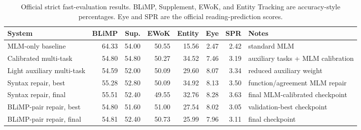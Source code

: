 \begin{table}[t]
\centering
\small
\begin{tabular}{lrrrrrrl}
\toprule
\textbf{System} & \textbf{BLiMP} & \textbf{Sup.} & \textbf{EWoK} & \textbf{Entity} & \textbf{Eye} & \textbf{SPR} & \textbf{Notes} \\
\midrule
MLM-only baseline & 64.33 & 54.00 & 50.55 & 15.56 & 2.47 & 2.42 & standard MLM \\
Calibrated multi-task & 54.80 & 54.80 & 50.27 & 34.52 & 7.46 & 3.19 & auxiliary tasks + MLM calibration \\
Light auxiliary multi-task & 54.59 & 52.00 & 50.09 & 29.60 & 8.07 & 3.34 & reduced auxiliary weight \\
Syntax repair, best & 55.28 & 52.80 & 50.09 & 34.92 & 8.13 & 3.50 & function/agreement MLM repair \\
Syntax repair, final & 55.51 & 52.40 & 49.55 & 32.76 & 8.28 & 3.63 & final MLM-calibrated checkpoint \\
BLiMP-pair repair, best & 54.80 & 51.60 & 51.00 & 27.54 & 8.02 & 3.05 & validation-best checkpoint \\
BLiMP-pair repair, final & 54.81 & 52.40 & 50.73 & 25.99 & 7.96 & 3.11 & final checkpoint \\
\bottomrule
\end{tabular}
\caption{Official strict fast-evaluation results. BLiMP, Supplement, EWoK, and Entity Tracking are accuracy-style percentages. Eye and SPR are the official reading-prediction scores.}
\label{tab:main-results}
\end{table}
